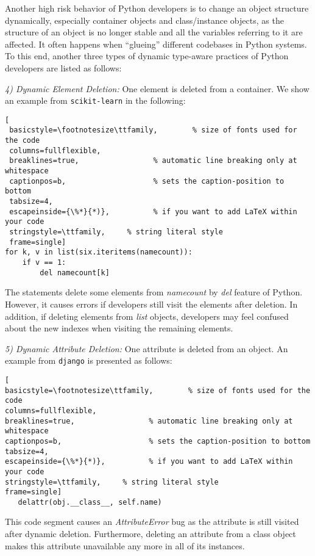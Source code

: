 Another high risk behavior of Python developers is to change an object structure dynamically, especially container objects and class/instance objects, as the structure of an object is no longer stable and all the variables referring to it are affected. It often happens when ``glueing'' different codebases in Python systems. To this end, another three types of dynamic type-aware practices of Python developers are listed as follows:

\emph{4) Dynamic Element Deletion:} One element is deleted from a container. We show an example from {\tt scikit-learn}\cite{b38} in the following:

 \begin{lstlisting}[
 basicstyle=\footnotesize\ttfamily,        % size of fonts used for the code
 columns=fullflexible,
 breaklines=true,                 % automatic line breaking only at whitespace
 captionpos=b,                    % sets the caption-position to bottom
 tabsize=4,
 escapeinside={\%*}{*)},          % if you want to add LaTeX within your code
 stringstyle=\ttfamily,     % string literal style
 frame=single]
for k, v in list(six.iteritems(namecount)):
	if v == 1:
		del namecount[k]
 \end{lstlisting}
\noindent The statements delete some elements from \textit{namecount} by \textit{del} feature of Python. However, it causes errors if developers still visit the elements after deletion. In addition, if deleting elements from \textit{list} objects, developers may feel confused about the new indexes when visiting the remaining elements. 

\emph{5) Dynamic Attribute Deletion:} One attribute is deleted from an object. An example from {\tt django}\cite{b39} is presented as follows:
 \begin{lstlisting}[
basicstyle=\footnotesize\ttfamily,        % size of fonts used for the code
columns=fullflexible,
breaklines=true,                 % automatic line breaking only at whitespace
captionpos=b,                    % sets the caption-position to bottom
tabsize=4,
escapeinside={\%*}{*)},          % if you want to add LaTeX within your code
stringstyle=\ttfamily,     % string literal style
frame=single]
   delattr(obj.__class__, self.name)
\end{lstlisting}
\noindent This code segment causes an \emph{AttributeError} bug as the attribute is still visited after dynamic deletion. Furthermore, deleting an attribute from a class object makes this attribute unavailable any more in all of its instances.

